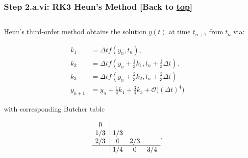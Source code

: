 \documentclass[landscape,letterpaper,10pt,english]{article}
\begin{document}
    \hypertarget{step-2.a.vi-rk3-heuns-method-back-to-top}{%
\subsubsection{\texorpdfstring{Step 2.a.vi: RK3 Heun's Method {[}Back to
\hyperref[toc]{top}{]}}{Step 2.a.vi: RK3 Heun's Method {[}Back to {]}}}\label{step-2.a.vi-rk3-heuns-method-back-to-top}}

\[\label{rk3heun}\]

\href{https://en.wikipedia.org/w/index.php?title=List_of_Runge\%E2\%80\%93Kutta_methods\&oldid=896594269}{Heun's
third-order method} obtains the solution \(y(t)\) at time \(t_{n+1}\)
from \(t_n\) via:

\begin{align}
k_1 &= \Delta tf(y_n, t_n), \\
k_2 &= \Delta tf(y_n + \frac{1}{3}k_1, t_n + \frac{1}{3}\Delta t), \\
k_3 &= \Delta tf(y_n + \frac{2}{3}k_2, t_n + \frac{2}{3}\Delta t) \\
y_{n+1} &= y_n + \frac{1}{4}k_1 + \frac{3}{4}k_3 + \mathcal{O}\big((\Delta t)^4\big)
\end{align}

with corresponding Butcher table

\[
\begin{array}{c|ccc}
    0 & \\
    1/3 & 1/3 & \\
    2/3 & 0 & 2/3 & \\ \hline
     & 1/4 & 0 & 3/4
\end{array}.
\]
\end{document}
